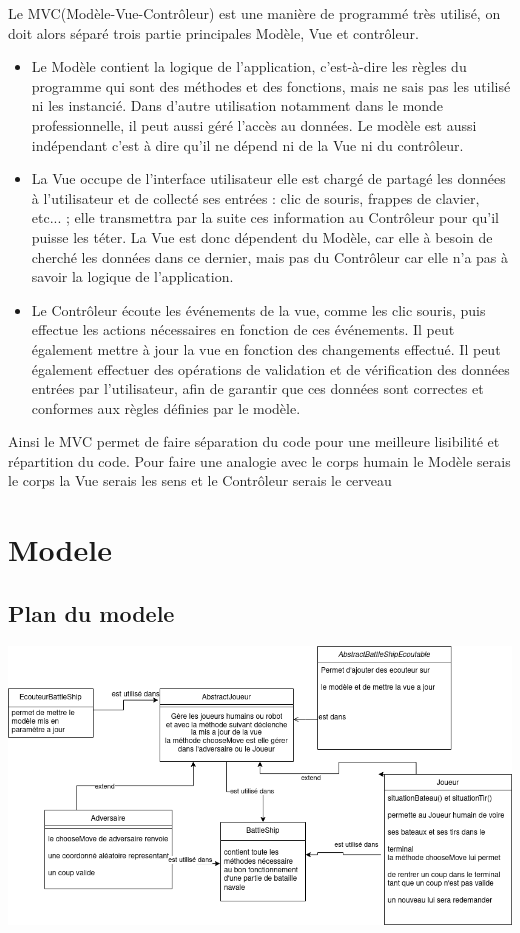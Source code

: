 \documentclass[a4paper,12pt]{article} %
\begin{document}
Le MVC(Modèle-Vue-Contrôleur) est une manière de programmé très utilisé, on doit alors séparé trois partie principales Modèle, Vue et contrôleur.
\begin{itemize}
\item Le Modèle contient la logique de l'application, c'est-à-dire les règles du programme qui sont des méthodes et des fonctions, mais ne sais pas les utilisé ni les instancié. Dans d'autre utilisation notamment dans le monde professionnelle, il peut aussi géré l'accès au données. Le modèle est aussi indépendant c'est à dire qu'il ne dépend ni de la Vue ni du contrôleur.

\item La Vue occupe de l'interface utilisateur elle est chargé de partagé les données à l'utilisateur et de collecté ses entrées : clic de souris, frappes de clavier, etc... ; elle transmettra par la suite ces information au Contrôleur pour qu'il puisse les téter. La Vue est donc dépendent du Modèle, car elle à besoin de cherché les données dans ce dernier, mais pas du Contrôleur car elle n'a pas à savoir la logique de l'application.

\item Le Contrôleur écoute les événements de la vue, comme les clic souris, puis  effectue les actions nécessaires en fonction de ces événements. Il peut également mettre à jour la vue en fonction des changements effectué. Il peut également effectuer des opérations de validation et de vérification des données entrées par l'utilisateur, afin de garantir que ces données sont correctes et conformes aux règles définies par le modèle.
\end{itemize}

Ainsi le MVC permet de faire séparation du code pour une meilleure lisibilité et répartition du code.
Pour faire une analogie avec le corps humain le Modèle serais le corps la Vue serais les sens et le Contrôleur serais le cerveau 


\section{Modele}
\subsection{Plan du modele}
\includegraphics[scale=0.5]{Diagramme.png}
\end{document}
